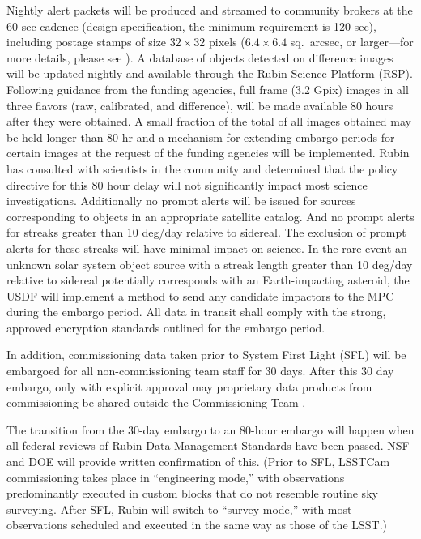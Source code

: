 Nightly alert packets will be produced and streamed to community brokers at the 60 sec cadence (design specification, the minimum requirement is 120 sec), including postage stamps of size $32 \times 32$ pixels ($6.4 \times 6.4$ sq.\ \gls{arcsec}, or larger---for more details, please see ).
A database of objects detected on difference images will be updated nightly and available through the Rubin Science Platform (\gls{RSP}).
Following guidance from the funding agencies, full frame (3.2 Gpix) images in all three flavors (raw, calibrated, and difference), will be made available 80 hours after they were obtained.
A small fraction of the total of all images obtained may be held longer than 80 hr and a mechanism for extending embargo periods for certain images at the request of the funding agencies will be implemented.
Rubin has consulted with scientists in the community and determined that the policy directive for this 80 hour delay will not significantly impact most science investigations.
Additionally no prompt alerts will be issued for sources corresponding to objects in an appropriate satellite catalog.
And no prompt alerts for streaks greater than 10 \gls{deg}/day relative to sidereal.
The exclusion of prompt alerts for these streaks will have minimal impact on science.
In the rare event an unknown solar system object source with a streak length greater than 10 \gls{deg}/day relative to sidereal potentially corresponds with an Earth-impacting asteroid, the \gls{USDF} will implement a method to send any candidate impactors to the \gls{MPC} during the embargo period.
All data in transit shall comply with the strong, approved encryption standards outlined for the embargo period.

In addition, commissioning data taken prior to System First Light (SFL) will be embargoed for all non-commissioning team staff for 30 days.
After this 30 day embargo, only with explicit approval may proprietary data products from commissioning be shared outside the \gls{Commissioning} Team  .

The transition from the 30-day embargo to an 80-hour embargo will happen when all federal reviews of Rubin Data Management Standards have been passed. 
NSF and DOE will provide written confirmation of this.
(Prior to SFL, LSSTCam commissioning takes place in ``engineering mode,'' with observations predominantly executed in custom blocks that do not resemble routine sky surveying. 
After SFL, Rubin will switch to ``survey mode,'' with most observations scheduled and executed in the same way as those of the LSST.)  

